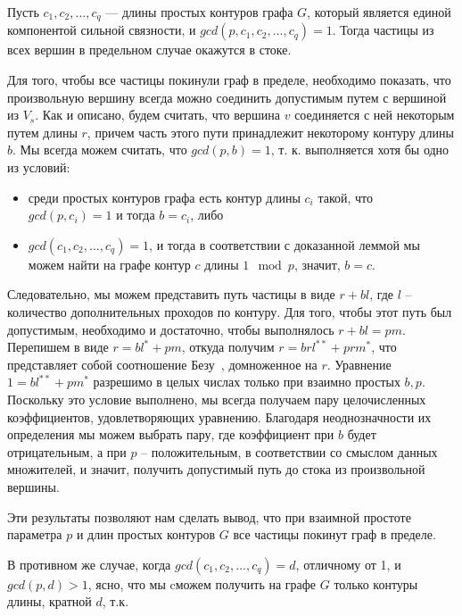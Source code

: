 	\begin{mytheorem}
		Пусть $c_1, c_2, ... , c_q $ --- длины простых контуров графа $G$, который является единой компонентой сильной связности, и $gcd(p, c_1, c_2, ... , c_q) = 1$. Тогда частицы из всех вершин в предельном случае окажутся в стоке.
	\end{mytheorem}

	\begin{myproof}	
		Для того, чтобы все частицы покинули граф в пределе, необходимо показать, что произвольную вершину всегда можно соединить допустимым путем с вершиной из $V_s$. Как и описано, будем считать, что вершина $v$ соединяется с ней некоторым путем  длины $r$, причем часть этого пути принадлежит некоторому контуру длины $b$. Мы всегда можем считать, что $gcd(p, b) = 1$, т. к. выполняется хотя бы одно из условий:
		
		\begin{itemize}
			\item среди простых контуров графа есть контур длины $c_i$ такой, что $gcd(p, c_i) = 1$ и тогда $b = c_i$, либо
			\item $gcd(c_1, c_2, ... , c_q) = 1$, и тогда в соответствии с доказанной леммой мы можем найти на графе контур $c$ длины  $1\mod p$, значит, $b = c$.
		\end{itemize}
		
		Следовательно, мы можем представить путь частицы в виде $r + bl$, где $l$ – количество дополнительных проходов по контуру. Для того, чтобы этот путь был допустимым, необходимо и достаточно, чтобы выполнялось $r + bl = pm$. Перепишем в виде $r = bl^* + pm$, откуда получим $r = brl^{**} + prm^*$, что представляет собой соотношение Безу~\autocite{Hasse}, домноженное на $r$. Уравнение $1  =bl^{**} + pm^*$ разрешимо в целых числах только при взаимно простых $b, p$. Поскольку это условие выполнено, мы всегда получаем пару целочисленных коэффициентов, удовлетворяющих уравнению. Благодаря неоднозначности их определения мы можем выбрать пару, где коэффициент при $b$ будет отрицательным, а при $p$ – положительным, в соответствии со смыслом данных множителей, и значит, получить допустимый путь до стока из произвольной вершины.
		
	\end{myproof}

	Эти результаты позволяют нам сделать вывод, что при взаимной простоте параметра $p$ и длин простых контуров $G$ все частицы покинут граф в пределе. 
	
	В противном же случае, когда $gcd(c_1, c_2, ... , c_q) = d$, отличному от 1, и $gcd(p,d) > 1$, ясно, что мы cможем получить на графе $G$ только контуры длины, кратной $d$, т.к. 
	
